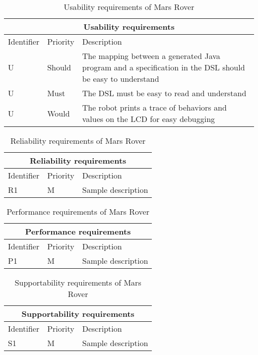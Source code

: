 \setcounter{TCC}{1}
\begin{table}[H]
	\centering
	\begin{tabular}{|l|l|l|}
		\hline
		\multicolumn{3}{|c|}{Usability requirements} \\  \hline
		\hline
		Identifier & Priority & Description \\  
		\hline
		\hline
		U\doTCC & Should & The mapping between a generated Java program and a
			specification in the DSL should be easy to understand \\  \hline
		U\doTCC & Must & The DSL must be easy to read and understand \\  \hline
		U\doTCC & Would & The robot prints a trace of behaviors and values on
			the LCD for easy debugging \\  
		\hline
	\end{tabular}
\caption{Usability requirements of Mars Rover}
\label{tbl:usabilityReq}
\end{table}

\setcounter{TCC}{1}
\begin{table}[H]
	\centering
	\begin{tabular}{|l|l|l|}
		\hline
		\multicolumn{3}{|c|}{Reliability requirements} \\  \hline
		\hline
		Identifier & Priority & Description \\  
		\hline
		\hline
		R1 & M & Sample description \\  
		\hline
	\end{tabular}
\caption{Reliability requirements of Mars Rover}
\label{tbl:reliabilityReq}
\end{table}

\begin{table}[H]
	\centering
	\begin{tabular}{|l|l|l|}
		\hline
		\multicolumn{3}{|c|}{Performance requirements} \\  \hline
		\hline
		Identifier & Priority & Description \\  
		\hline
		\hline
		P1 & M & Sample description \\  
		\hline
	\end{tabular}
\caption{Performance requirements of Mars Rover}
\label{tbl:performanceReq}
\end{table}

\begin{table}[H]
	\centering
	\begin{tabular}{|l|l|l|}
		\hline
		\multicolumn{3}{|c|}{Supportability requirements} \\  \hline
		\hline
		Identifier & Priority & Description \\  
		\hline
		\hline
		S1 & M & Sample description \\  
		\hline
	\end{tabular}
\caption{Supportability requirements of Mars Rover}
\label{tbl:supportabilityReq}
\end{table}
